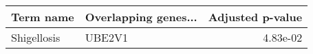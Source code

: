\begin{tabular}{llr}
\toprule
  Term name & Overlapping genes... &  Adjusted p-value \\
\midrule
Shigellosis &               UBE2V1 &          4.83e-02 \\
\bottomrule
\end{tabular}
